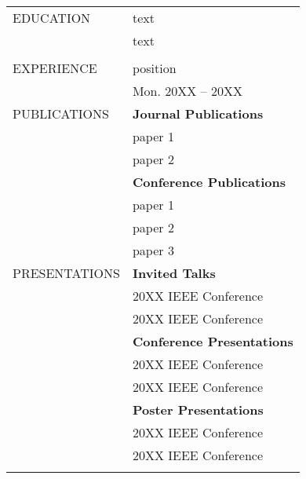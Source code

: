 \centerline{\huge\MakeUppercase \@author}
\vspace{11pt}
\begin{singlespace}
\begin{longtable}{p{} p{}} 
		EDUCATION    & text \\
		
		& text
		\\\\
		
		EXPERIENCE   & position\\ &\hfill Mon. 20XX -- 20XX \\

		
		PUBLICATIONS & \textbf{Journal Publications}\\

		& paper 1 \vspace{0.05in}\\
		& paper 2 \vspace{0.15in}\\


		& \textbf{Conference Publications}\\
		& paper 1 \vspace{0.05in}\\
		& paper 2 \vspace{0.05in}\\
		& paper 3 \vspace{0.15in}\\
		
		PRESENTATIONS
		& \textbf{Invited Talks}\\
		& 20XX IEEE Conference \vspace{0.05in}\\
		& 20XX IEEE Conference
		\vspace{0.15in}\\
		
		& \textbf{Conference Presentations}\\
		& 20XX IEEE Conference \vspace{0.05in}\\
		& 20XX IEEE Conference
		\vspace{0.15in}\\
		
		& \textbf{Poster Presentations}\\
		& 20XX IEEE Conference \vspace{0.05in}\\
		& 20XX IEEE Conference
		\vspace{0.15in}
		\\\\
		

\end{longtable}
\end{singlespace}

